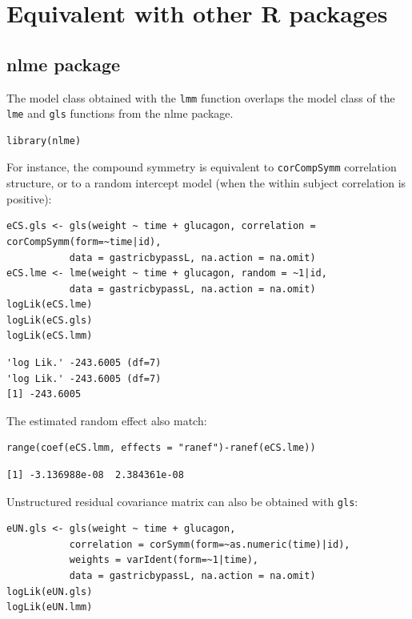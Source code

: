 \documentclass[12pt]{article}
\begin{document}
\clearpage

\section{Equivalent with other R packages}
\label{sec:orgd37a1b9}

\subsection{nlme package}
\label{sec:orga16cc40}

The model class obtained with the \texttt{lmm} function overlaps the model
class of the \texttt{lme} and \texttt{gls} functions from the nlme package.
\lstset{language=r,label= ,caption= ,captionpos=b,numbers=none}
\begin{lstlisting}
library(nlme)
\end{lstlisting}

For instance, the compound symmetry is equivalent to \texttt{corCompSymm}
correlation structure, or to a random intercept model (when the within
subject correlation is positive):
\lstset{language=r,label= ,caption= ,captionpos=b,numbers=none}
\begin{lstlisting}
eCS.gls <- gls(weight ~ time + glucagon, correlation = corCompSymm(form=~time|id),
	       data = gastricbypassL, na.action = na.omit)
eCS.lme <- lme(weight ~ time + glucagon, random = ~1|id,
	       data = gastricbypassL, na.action = na.omit)
logLik(eCS.lme)
logLik(eCS.gls)
logLik(eCS.lmm)
\end{lstlisting}

\begin{verbatim}
'log Lik.' -243.6005 (df=7)
'log Lik.' -243.6005 (df=7)
[1] -243.6005
\end{verbatim}


The estimated random effect also match:
\lstset{language=r,label= ,caption= ,captionpos=b,numbers=none}
\begin{lstlisting}
range(coef(eCS.lmm, effects = "ranef")-ranef(eCS.lme))
\end{lstlisting}

\begin{verbatim}
[1] -3.136988e-08  2.384361e-08
\end{verbatim}


Unstructured residual covariance matrix can also be obtained with
\texttt{gls}:
\lstset{language=r,label= ,caption= ,captionpos=b,numbers=none}
\begin{lstlisting}
eUN.gls <- gls(weight ~ time + glucagon,
	       correlation = corSymm(form=~as.numeric(time)|id),
	       weights = varIdent(form=~1|time),
	       data = gastricbypassL, na.action = na.omit)
logLik(eUN.gls)
logLik(eUN.lmm)
\end{lstlisting}
\end{document}
